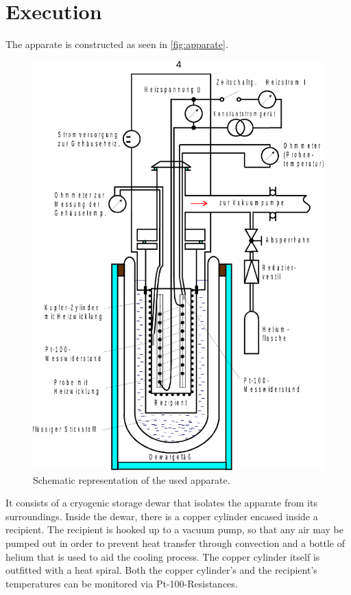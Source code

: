 \section{Execution}
\label{sec:Durchführung}

The apparate is constructed as seen in \autoref{fig:apparate}.

\begin{figure}[H]
    \centering
    \includegraphics[]{figures/apparature.pdf}
    \caption{Schematic representation of the used apparate.}
    \label{fig:apparate}
\end{figure}

It consists of a cryogenic storage dewar that isolates the apparate from its surroundings. Inside the dewar, there is a copper cylinder encased inside a recipient.
The recipient is hooked up to a vacuum pump, so that any air may be pumped out in order to prevent heat transfer through convection and a bottle of helium that is used to aid the cooling process.
The copper cylinder itself is outfitted with a heat spiral.
Both the copper cylinder's and the recipient's temperatures can be monitored via Pt-100-Resistances. \\

